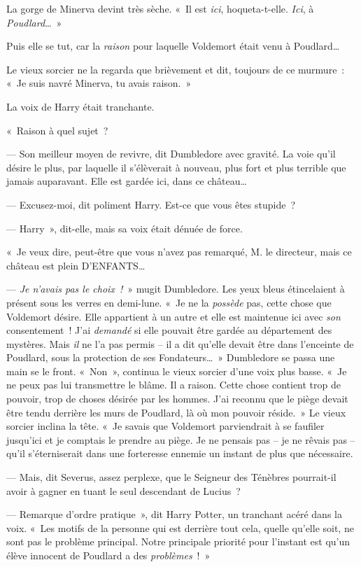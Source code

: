 La gorge de Minerva devint très sèche. «~Il est \emph{ici}, hoqueta-t-elle. \emph{Ici}, à \emph{Poudlard}…~»

Puis elle se tut, car la \emph{raison} pour laquelle Voldemort était venu à Poudlard…

Le vieux sorcier ne la regarda que brièvement et dit, toujours de ce murmure~: «~Je suis navré Minerva, tu avais raison.~»

La voix de Harry était tranchante.

«~Raison à quel sujet~?

--- Son meilleur moyen de revivre, dit Dumbledore avec gravité. La voie qu'il désire le plus, par laquelle il s'élèverait à nouveau, plus fort et plus terrible que jamais auparavant. Elle est gardée ici, dans ce château…

--- Excusez-moi, dit poliment Harry. Est-ce que vous êtes stupide~?

--- Harry~», dit-elle, mais sa voix était dénuée de force.

«~Je veux dire, peut-être que vous n'avez pas remarqué, M. le directeur, mais ce château est plein D'ENFANTS…

--- \emph{Je n'avais pas le choix~!}~» mugit Dumbledore. Les yeux bleus étincelaient à présent sous les verres en demi-lune. «~Je ne la \emph{possède} pas, cette chose que Voldemort désire. Elle appartient à un autre et elle est maintenue ici avec \emph{son} consentement~! J'ai \emph{demandé} si elle pouvait être gardée au département des mystères. Mais \emph{il} ne l'a pas permis -- il a dit qu'elle devait être dans l'enceinte de Poudlard, sous la protection de ses Fondateurs…~» Dumbledore se passa une main se le front. «~Non~», continua le vieux sorcier d'une voix plus basse. «~Je ne peux pas lui transmettre le blâme. Il a raison. Cette chose contient trop de pouvoir, trop de choses désirée par les hommes. J'ai reconnu que le piège devait être tendu derrière les murs de Poudlard, là où mon pouvoir réside.~» Le vieux sorcier inclina la tête. «~Je savais que Voldemort parviendrait à se faufiler jusqu'ici et je comptais le prendre au piège. Je ne pensais pas -- je ne rêvais pas -- qu'il s'éterniserait dans une forteresse ennemie un instant de plus que nécessaire.

--- Mais, dit Severus, assez perplexe, que le Seigneur des Ténèbres pourrait-il avoir à gagner en tuant le seul descendant de Lucius~?

--- Remarque d'ordre pratique~», dit Harry Potter, un tranchant acéré dans la voix. «~Les motifs de la personne qui est derrière tout cela, quelle qu'elle soit, ne sont pas le problème principal. Notre principale priorité pour l'instant est qu'un élève innocent de Poudlard a des \emph{problèmes}~!~»


